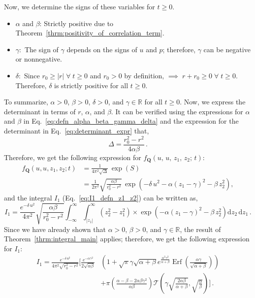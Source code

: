 \documentclass[journal]{IEEEtran}
\theoremstyle{plain}
\theoremstyle{definition}
\theoremstyle{remark}
\newcommand{\R}{\mathbb{R}}
\newcommand{\Ot}{\mathcal{T}}
\newcommand{\Erf}{\operatorname{Erf}}
\newcommand{\dd}{\mathrm{d}}
\begin{document}
Now, we determine the signs of these variables for $t \geq 0$.
\begin{itemize}
    \item $\alpha$ and $\beta$: Strictly positive due to Theorem~\ref{thrm:positivity_of_correlation_term}.
    \item $\gamma:$ The sign of $\gamma$ depends on the signs of $u$ and $p$; therefore, $\gamma$ can be negative or nonnegative.
    \item $\delta:$ Since $r_0 \geq |r| \; \forall \; t \geq 0$ and $r_0 > 0$ by definition, $\implies \; r+r_0 \geq 0 \; \forall \; t \geq 0$. Therefore, $\delta$ is strictly positive for all $t\geq 0$.
\end{itemize}
To summarize, $\alpha > 0$, $\beta>0$, $\delta>0$, and $\gamma \in \R$ for all $t \geq 0$. Now, we express the determinant in terms of $r$, $\alpha$, and $\beta$. It can be verified using the expressions for $\alpha$ and $\beta$ in Eq.~\eqref{eq:defn_alpha_beta_gamma_delta} and the expression for the determinant in Eq.~\eqref{eq:determinant_expr} that,
\begin{equation}
    \Delta = \frac{r_0^2 - r^2}{4 \alpha \beta} \,.
\end{equation}
Therefore, we get the following expression for $f_{\mathbf{Q}}(u, \,u, \,z_1, \,z_2; \, t)$:
\begin{equation}
\begin{split}
    f_{\mathbf{Q}}(u, u, z_1, z_2;  t)  &= \frac{1}{4\pi^2\sqrt{\Delta}}\, \exp\left(S\right) \\
    &= \frac{1}{2\pi^2}\sqrt{\frac{\alpha\beta}{r_0^2-r^2}} \,\exp\left( -\delta \, u^2 - \alpha \left(z_1 - \gamma \right)^2 - \beta \, z_2^2\right) ,
\end{split}  \label{eq:expression_for_f_Q}
\end{equation}
and the integral $I_1$ (Eq.~\eqref{eq:I1_defn_z1_z2}) can be written as,
\begin{equation}
    I_1 = \frac{e^{-\delta\,u^2}}{4\pi^2}\sqrt{\frac{\alpha\beta}{r_0^2-r^2}}\int_{-\infty}^\infty \int_{|z_1|}^\infty \left(z_2^2 - z_1^2\right) \times\exp\left(- \alpha \left(z_1 - \gamma \right)^2 - \beta \, z_2^2\right) \dd z_2 \, \dd z_1 \,.
\end{equation}
Since we have already shown that $\alpha>0$, $\beta>0$, and $\gamma\in \R$, the result of Theorem~\ref{thrm:integral_main} applies; therefore, we get the following expression for $I_1$:
\begin{equation}
\begin{split}
    I_1 = \frac{e^{-\delta\,u^2}}{4\pi^2 \sqrt{r_0^2-r^2}} \Biggl[\frac{e^{-\alpha \gamma^2}}{2\sqrt{\alpha\beta}} &\left(1 + \sqrt{\pi} \gamma \sqrt{\alpha + \beta} e^{\frac{\alpha^2 \gamma^2}{\alpha + \beta}} \Erf\left(\frac{\alpha \gamma}{\sqrt{\alpha + \beta}}\right)\right)  \\& + \pi \left(\frac{\alpha - \beta - 2\alpha\beta\gamma^2}{\alpha\beta}\right) \Ot\left(\gamma\sqrt{\frac{2\alpha\beta}{\alpha+\beta}}, \sqrt{\frac{\alpha}{\beta}}\right)\Biggr] \,. \label{eq:final_expr_for_I1}
\end{split}
\end{equation}
\end{document}
